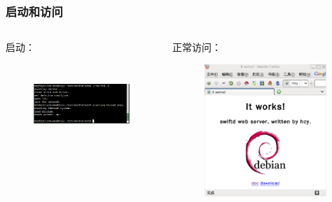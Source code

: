 \documentclass[10pt,dvipdfm]{beamer}
\begin{document}
\begin{frame}
	\frametitle{启动和访问}
	\begin{columns}
		\begin{column}{0.4\textwidth}
			\begin{block}{启动：}
			\begin{figure}[htbp]
			\centering
			\includegraphics[height=3cm, width=4.5cm]{pics/startup.eps}
			\end{figure}
			\end{block}
		\end{column}
		
		\begin{column}{0.5\textwidth}
			\begin{block}{正常访问：}
			\begin{figure}[htbp]
			\centering
			\includegraphics[height=5cm, width=6cm]{pics/works.eps}
			\end{figure}
			\end{block}
		\end{column}
	\end{columns}
\end{frame}
\end{document}
